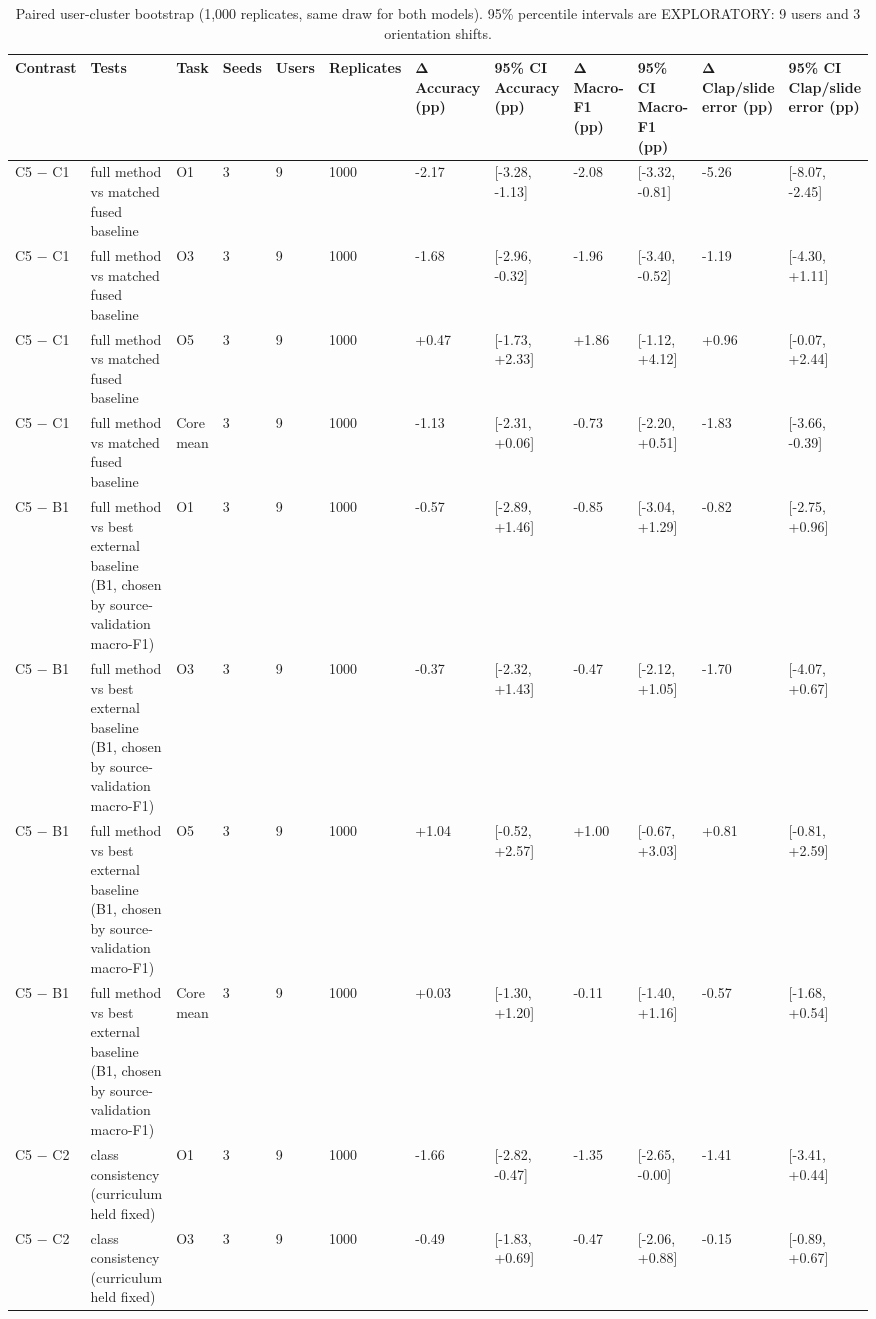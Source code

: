\begin{table}[t]
\centering
\small
\caption{Paired user-cluster bootstrap (1,000 replicates, same draw for both models). 95\% percentile intervals are EXPLORATORY: 9 users and 3 orientation shifts.}
\label{tab:T4_bootstrap}
\begin{tabular}{llllllllllll}
\hline
Contrast & Tests & Task & Seeds & Users & Replicates & Δ Accuracy (pp) & 95\% CI Accuracy (pp) & Δ Macro-F1 (pp) & 95\% CI Macro-F1 (pp) & Δ Clap/slide error (pp) & 95\% CI Clap/slide error (pp) \\
\hline
C5 $-$ C1 & full method vs matched fused baseline & O1 & 3 & 9 & 1000 & -2.17 & [-3.28, -1.13] & -2.08 & [-3.32, -0.81] & -5.26 & [-8.07, -2.45] \\
C5 $-$ C1 & full method vs matched fused baseline & O3 & 3 & 9 & 1000 & -1.68 & [-2.96, -0.32] & -1.96 & [-3.40, -0.52] & -1.19 & [-4.30, +1.11] \\
C5 $-$ C1 & full method vs matched fused baseline & O5 & 3 & 9 & 1000 & +0.47 & [-1.73, +2.33] & +1.86 & [-1.12, +4.12] & +0.96 & [-0.07, +2.44] \\
C5 $-$ C1 & full method vs matched fused baseline & Core mean & 3 & 9 & 1000 & -1.13 & [-2.31, +0.06] & -0.73 & [-2.20, +0.51] & -1.83 & [-3.66, -0.39] \\
C5 $-$ B1 & full method vs best external baseline (B1, chosen by source-validation macro-F1) & O1 & 3 & 9 & 1000 & -0.57 & [-2.89, +1.46] & -0.85 & [-3.04, +1.29] & -0.82 & [-2.75, +0.96] \\
C5 $-$ B1 & full method vs best external baseline (B1, chosen by source-validation macro-F1) & O3 & 3 & 9 & 1000 & -0.37 & [-2.32, +1.43] & -0.47 & [-2.12, +1.05] & -1.70 & [-4.07, +0.67] \\
C5 $-$ B1 & full method vs best external baseline (B1, chosen by source-validation macro-F1) & O5 & 3 & 9 & 1000 & +1.04 & [-0.52, +2.57] & +1.00 & [-0.67, +3.03] & +0.81 & [-0.81, +2.59] \\
C5 $-$ B1 & full method vs best external baseline (B1, chosen by source-validation macro-F1) & Core mean & 3 & 9 & 1000 & +0.03 & [-1.30, +1.20] & -0.11 & [-1.40, +1.16] & -0.57 & [-1.68, +0.54] \\
C5 $-$ C2 & class consistency (curriculum held fixed) & O1 & 3 & 9 & 1000 & -1.66 & [-2.82, -0.47] & -1.35 & [-2.65, -0.00] & -1.41 & [-3.41, +0.44] \\
C5 $-$ C2 & class consistency (curriculum held fixed) & O3 & 3 & 9 & 1000 & -0.49 & [-1.83, +0.69] & -0.47 & [-2.06, +0.88] & -0.15 & [-0.89, +0.67] \\

\end{tabular}
\end{table}
